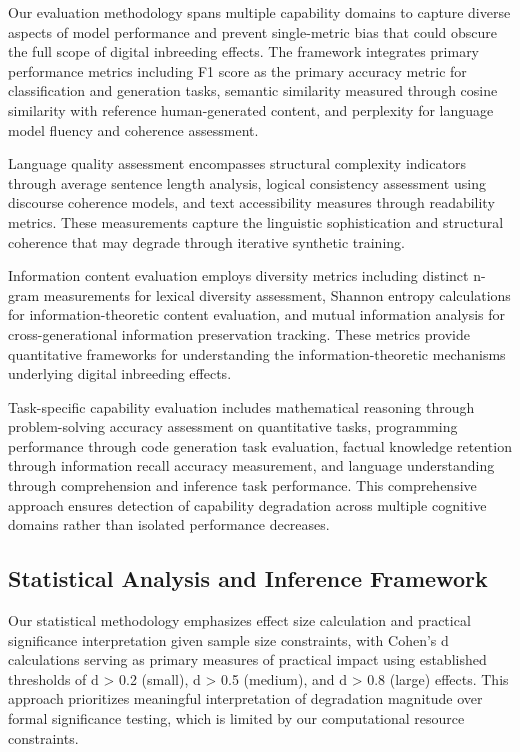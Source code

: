 \documentclass{article}
\begin{document}
Our evaluation methodology spans multiple capability domains to capture diverse aspects of model performance and prevent single-metric bias that could obscure the full scope of digital inbreeding effects. The framework integrates primary performance metrics including F1 score as the primary accuracy metric for classification and generation tasks, semantic similarity measured through cosine similarity with reference human-generated content, and perplexity for language model fluency and coherence assessment.

Language quality assessment encompasses structural complexity indicators through average sentence length analysis, logical consistency assessment using discourse coherence models, and text accessibility measures through readability metrics. These measurements capture the linguistic sophistication and structural coherence that may degrade through iterative synthetic training.

Information content evaluation employs diversity metrics including distinct n-gram measurements for lexical diversity assessment, Shannon entropy calculations for information-theoretic content evaluation, and mutual information analysis for cross-generational information preservation tracking. These metrics provide quantitative frameworks for understanding the information-theoretic mechanisms underlying digital inbreeding effects.

Task-specific capability evaluation includes mathematical reasoning through problem-solving accuracy assessment on quantitative tasks, programming performance through code generation task evaluation, factual knowledge retention through information recall accuracy measurement, and language understanding through comprehension and inference task performance. This comprehensive approach ensures detection of capability degradation across multiple cognitive domains rather than isolated performance decreases.

\subsection{Statistical Analysis and Inference Framework}

Our statistical methodology emphasizes effect size calculation and practical significance interpretation given sample size constraints, with Cohen's d calculations serving as primary measures of practical impact using established thresholds of d > 0.2 (small), d > 0.5 (medium), and d > 0.8 (large) effects. This approach prioritizes meaningful interpretation of degradation magnitude over formal significance testing, which is limited by our computational resource constraints.
\end{document}

